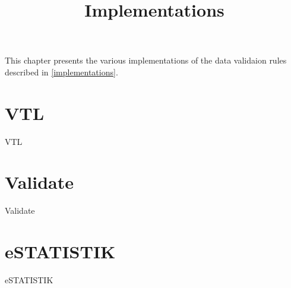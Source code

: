 \title{Implementations}

\vspace{0.6 cm}

\noindent
This chapter presents the various implementations of the data validaion rules described in \ref{implementations}.

\section{VTL}

VTL

\section{Validate}

Validate

\section{eSTATISTIK}

eSTATISTIK

